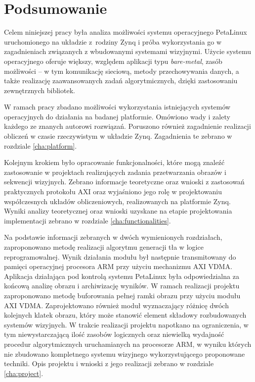 \chapter{Podsumowanie}
\label{chap:summary}


Celem niniejszej pracy była analiza możliwości systemu operacyjnego PetaLinux uruchomionego na układzie z~rodziny Zynq i próba wykorzystania go w zagadnieniach związanych z wbudowanymi systemami wizyjnymi. 
Użycie systemu operacyjnego oferuje większy, względem aplikacji typu \textit{bare-metal}, zasób możliwości -- w tym komunikację sieciową, metody przechowywania danych, a także realizację zaawansowanych zadań algorytmicznych, dzięki zastosowaniu zewnętrznych bibliotek. %

W ramach pracy zbadano możliwości wykorzystania istniejących systemów operacyjnych do działania na badanej platformie. Omówiono wady i zalety każdego ze znanych autorowi rozwiązań. Poruszono również zagadnienie realizacji obliczeń w czasie rzeczywistym w układzie Zynq. Zagadnienia te zebrano w rozdziale \ref{cha:platform}.

Kolejnym krokiem było opracowanie funkcjonalności, które mogą znaleźć zastosowanie w projektach realizujących zadania przetwarzania obrazów i sekwencji wizyjnych. Zebrano informacje teoretyczne oraz wnioski z zastosowań praktycznych protokołu AXI oraz wyjaśniono jego rolę w projektowaniu współczesnych układów obliczeniowych, realizowanych na platformie Zynq.
Wyniki analizy teoretycznej oraz wnioski uzyskane na etapie projektowania implementacji zebrano w rozdziale \ref{cha:functionalities}. 

Na podstawie informacji zebranych w dwóch wymienionych rozdziałach, zaproponowano metodę realizacji algorytmu generacji tła w logice reprogramowalnej. Wynik działania modułu był następnie transmitowany do pamięci operacyjnej procesora ARM przy użyciu mechanizmu AXI VDMA. Aplikacja działająca pod kontrolą systemu PetaLinux była odpowiedzialna za końcową analizę obrazu i archiwizację wyników.
W ramach realizacji projektu zaproponowano metodę buforowania pełnej ramki obrazu przy użyciu modułu AXI VDMA. Zaprojektowano również moduł wyznaczający różnicę dwóch kolejnych klatek obrazu, który może stanowić element składowy rozbudowanych systemów wizyjnych.
W trakcie realizacji projektu napotkano na ograniczenia, w tym niewystarczającą ilość zasobów logicznych oraz niewielką wydajność procedur algorytmicznych uruchamianych na procesorze ARM, w wyniku których nie zbudowano kompletnego systemu wizyjnego wykorzystującego proponowane techniki.
Opis projektu i wnioski z jego realizacji zebrano w rozdziale \ref{cha:project}.

